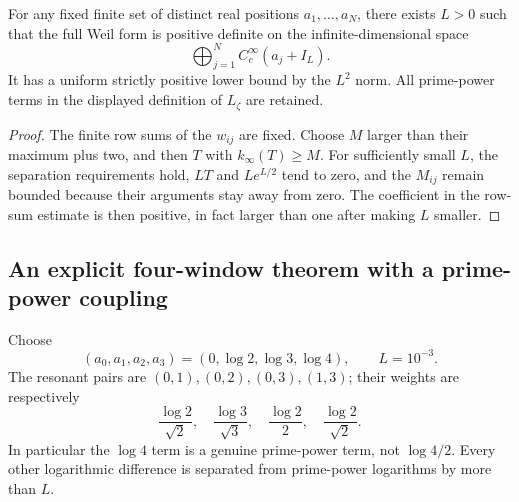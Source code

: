 \begin{theorem}\label{intake:weil:thm:any-windows}
For any fixed finite set of distinct real positions $a_1,\ldots,a_N$, there exists $L>0$ such that the full Weil form is positive definite on the infinite-dimensional space
\[
 \bigoplus_{j=1}^N C_c^\infty(a_j+I_L).
\]
It has a uniform strictly positive lower bound by the $L^2$ norm. All prime-power terms in the displayed definition of $L_\zeta$ are retained.
\end{theorem}
\begin{proof}
The finite row sums of the $w_{ij}$ are fixed. Choose $M$ larger than their maximum plus two, and then $T$ with $k_\infty(T)\ge M$. For sufficiently small $L$, the separation requirements hold, $LT$ and $Le^{L/2}$ tend to zero, and the $M_{ij}$ remain bounded because their arguments stay away from zero. The coefficient in the row-sum estimate is then positive, in fact larger than one after making $L$ smaller. 
\end{proof}

\subsection{An explicit four-window theorem with a prime-power coupling}
Choose
\[
 (a_0,a_1,a_2,a_3)=(0,\log2,\log3,\log4),\qquad L=10^{-3}.
\]
The resonant pairs are $(0,1),(0,2),(0,3),(1,3)$; their weights are respectively
\[
 \frac{\log2}{\sqrt2},\quad\frac{\log3}{\sqrt3},\quad
 \frac{\log2}{2},\quad\frac{\log2}{\sqrt2}.
\]
In particular the $\log4$ term is a genuine prime-power term, not $\log4/2$. Every other logarithmic difference is separated from prime-power logarithms by more than $L$.

